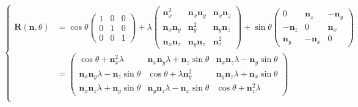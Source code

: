 \begin{equation}
\left\{
    \begin{array}{ll}
    \bm{R}(\bm{n},\theta) 
    &= 
          \cos\theta \begin{pmatrix}
                      1 & 0 & 0 \\
                      0 & 1 & 0 \\
                      0 & 0 & 1
                     \end{pmatrix}
          + \lambda \begin{pmatrix}
                    \bm{n}_x^2 & \bm{n}_x\bm{n}_y & \bm{n}_x\bm{n}_z \\
                    \bm{n}_x\bm{n}_y & \bm{n}_y^2 & \bm{n}_y\bm{n}_z \\
                    \bm{n}_x\bm{n}_z & \bm{n}_y\bm{n}_z & \bm{n}_z^2 
                    \end{pmatrix}
          + \sin\theta \begin{pmatrix}
                      0 & \bm{n}_z & -\bm{n}_y \\
                      -\bm{n}_z & 0 & \bm{n}_x \\
                      \bm{n}_y & -\bm{n}_x & 0
                      \end{pmatrix}
          \\
    ~&=  
        \begin{pmatrix}
              \cos\theta+\bm{n}_x^2\lambda & \bm{n}_x\bm{n}_y\lambda + \bm{n}_z\sin\theta & \bm{n}_x\bm{n}_z\lambda-\bm{n}_y\sin\theta \\
              \bm{n}_x\bm{n}_y\lambda - \bm{n}_z\sin\theta & \cos\theta+\lambda\bm{n}_y^2 & \bm{n}_y\bm{n}_z\lambda+\bm{n}_x\sin\theta \\
              \bm{n}_x\bm{n}_z\lambda + \bm{n}_y\sin\theta & \bm{n}_y\bm{n}_z\lambda - \bm{n}_x\sin\theta &  \cos\theta+\bm{n}_z^2\lambda 
          \end{pmatrix} \\
  \end{array}
\right.
\label{equa:rotate:matrix}
\end{equation}

